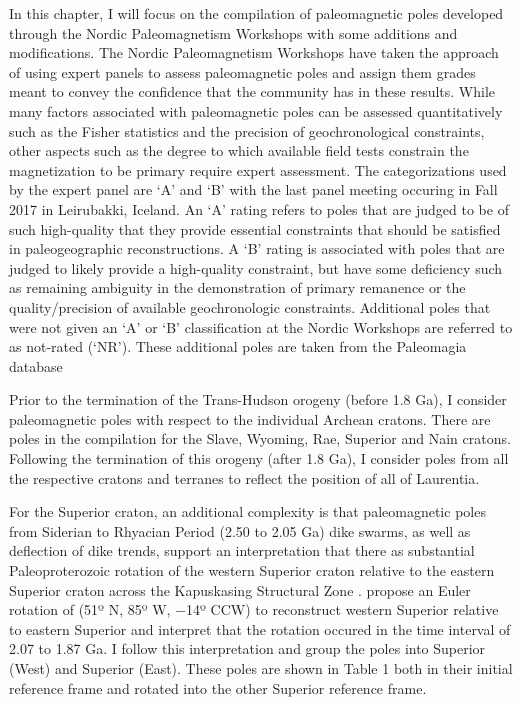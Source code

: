 \documentclass[11pt,letterpaper]{article}
\begin{document}
In this chapter, I will focus on the compilation of paleomagnetic poles developed through the Nordic Paleomagnetism Workshops with some additions and modifications. The Nordic Paleomagnetism Workshops have taken the approach of using expert panels to assess paleomagnetic poles and assign them grades meant to convey the confidence that the community has in these results. While many factors associated with paleomagnetic poles can be assessed quantitatively such as the Fisher statistics and the precision of geochronological constraints, other aspects such as the degree to which available field tests constrain the magnetization to be primary require expert assessment. The categorizations used by the expert panel are `A' and `B' with the last panel meeting occuring in Fall 2017 in Leirubakki, Iceland. An `A' rating refers to poles that are judged to be of such high-quality that they provide essential constraints that should be satisfied in paleogeographic reconstructions. A `B' rating is associated with poles that are judged to likely provide a high-quality constraint, but have some deficiency such as remaining ambiguity in the demonstration of primary remanence or the quality/precision of available geochronologic constraints. Additional poles that were not given an `A' or `B' classification at the Nordic Workshops are referred to as not-rated (`NR'). These additional poles are taken from the Paleomagia database \citep{Veikkolainen2013a}

Prior to the termination of the Trans-Hudson orogeny (before 1.8 Ga), I consider paleomagnetic poles with respect to the individual Archean cratons. There are poles in the compilation for the Slave, Wyoming, Rae, Superior and Nain cratons. Following the termination of this orogeny (after 1.8 Ga), I consider poles from all the respective cratons and terranes to reflect the position of all of Laurentia.

For the Superior craton, an additional complexity is that paleomagnetic poles from Siderian to Rhyacian Period (2.50 to 2.05 Ga) dike swarms, as well as deflection of dike trends, support an interpretation that there as substantial Paleoproterozoic rotation of the western Superior craton relative to the eastern Superior craton across the Kapuskasing Structural Zone \citep{Bates1991a, Evans2010a}. \cite{Evans2010a} propose an Euler rotation of (51º N, 85º W, −14º CCW) to reconstruct western Superior relative to eastern Superior and interpret that the rotation occured in the time interval of 2.07 to 1.87 Ga. I follow this interpretation and group the poles into Superior (West) and Superior (East). These poles are shown in Table 1 both in their initial reference frame and rotated into the other Superior reference frame.
\end{document}
